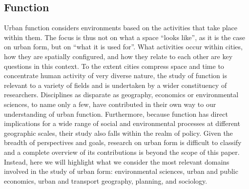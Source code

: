 \subsection{Function}
\label{sec:lit_function}


Urban function considers environments based on the activities that take place
within them.
%
The focus is thus not on what a space ``looks
like'', as it is the case on urban form, but on ``what it is used for''. What
activities occur within cities, how they are spatially configured, and how
they relate to each other are key questions in this context.
%
To the extent cities compress space and time to concentrate human activity of
very diverse nature, the study of function is relevant to a variety of
fields and is undertaken by a wider constituency of researchers. Disciplines
as disparate as geography, economics or environmental sciences, to name only a
few, have contributed in their own way to our understanding of urban
function.
Furthermore, because function has direct implications for a wide range of
social and environmental processes at different geographic scales, their study
also falls within the realm of policy.
%
Given the breadth of perspectives and goals, research on urban form is
difficult to classify and a complete overview of its contributions is beyond
the scope of this paper. Instead, here we will highlight what we consider the
most relevant domains involved in the study of urban form: environmental
sciences, urban and public economics, urban and transport geography, planning, and
sociology.

